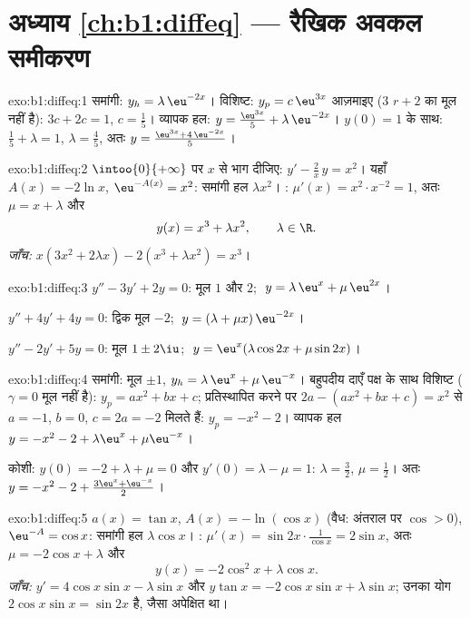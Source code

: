 \section*{अध्याय \ref{ch:b1:diffeq} --- रैखिक अवकल समीकरण}

\begin{solution}{exo:b1:diffeq:1}
समांगी: $y_h = \lambda\,\eu^{-2x}$। विशिष्ट: $y_p = c\,\eu^{3x}$ आज़माइए
($3$ $r + 2$ का मूल नहीं है): $3c + 2c = 1$, $c = \frac15$। व्यापक हल: $y =
\frac{\eu^{3x}}{5} + \lambda\,\eu^{-2x}$। $y(0) = 1$ के साथ: $\frac15 +
\lambda = 1$, $\lambda = \frac45$, अतः $y = \frac{\eu^{3x} +
4\,\eu^{-2x}}{5}$।
\end{solution}

\begin{solution}{exo:b1:diffeq:2}
$\intoo{0}{+\infty}$ पर $x$ से भाग दीजिए: $y' - \frac{2}{x}\,y = x^2$। यहाँ
$A(x) = -2\ln x$, $\eu^{-A(x)} = x^2$: समांगी हल $\lambda x^2$। : $\mu'(x) = x^2 \cdot x^{-2} = 1$, अतः $\mu = x + \lambda$ और
\[
y(x) = x^3 + \lambda x^2, \qquad \lambda \in \R .
\]
\emph{जाँच:} $x(3x^2 + 2\lambda x) - 2(x^3 + \lambda x^2) = x^3$।
\end{solution}

\begin{solution}{exo:b1:diffeq:3}
$y'' - 3y' + 2y = 0$: मूल $1$ और $2$; $\;y = \lambda\,\eu^{x} +
\mu\,\eu^{2x}$।

$y'' + 4y' + 4y = 0$: द्विक मूल $-2$; $\;y = (\lambda + \mu x)\,\eu^{-2x}$।

$y'' - 2y' + 5y = 0$: मूल $1 \pm 2\iu$; $\;y = \eu^{x}(\lambda\cos 2x +
\mu\sin 2x)$।
\end{solution}

\begin{solution}{exo:b1:diffeq:4}
समांगी: मूल $\pm 1$, $y_h = \lambda\,\eu^x + \mu\,\eu^{-x}$। बहुपदीय दाएँ
पक्ष के साथ विशिष्ट ($\gamma = 0$ मूल नहीं है): $y_p = ax^2 + bx + c$;
प्रतिस्थापित करने पर $2a - (ax^2 + bx + c) = x^2$ से $a = -1$, $b = 0$, $c =
2a = -2$ मिलते हैं: $y_p = -x^2 - 2$। व्यापक हल $y = -x^2 - 2 + \lambda\eu^x
+ \mu\eu^{-x}$।

कोशी: $y(0) = -2 + \lambda + \mu = 0$ और $y'(0) = \lambda - \mu = 1$:
$\lambda = \frac32$, $\mu = \frac12$। अतः $y = -x^2 - 2 + \frac{3\eu^x +
\eu^{-x}}{2}$।
\end{solution}

\begin{solution}{exo:b1:diffeq:5}
$a(x) = \tan x$, $A(x) = -\ln(\cos x)$ (वैध: अंतराल पर $\cos > 0$),
$\eu^{-A} = \cos x$: समांगी हल $\lambda\cos x$। : $\mu'(x) =
\sin 2x \cdot \frac{1}{\cos x} = 2\sin x$, अतः $\mu = -2\cos x + \lambda$ और
\[
y(x) = -2\cos^2 x + \lambda \cos x .
\]
\emph{जाँच:} $y' = 4\cos x \sin x - \lambda\sin x$ और $y\tan x = -2\cos
x\sin x + \lambda \sin x$; उनका योग $2\cos x\sin x = \sin 2x$ है, जैसा
अपेक्षित था।
\end{solution}

